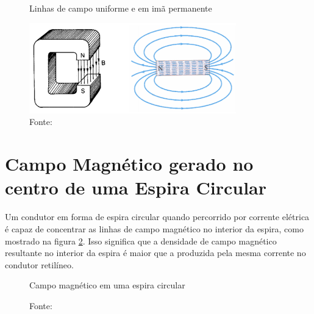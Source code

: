 \begin{figure}[H]
    \centering
     \caption{Linhas de campo uniforme e em imã permanente}
     \includegraphics[width=0.8\textwidth]{./img/mussoi10.png}
     \caption*{Fonte: \cite{mussoi2}}
     \label{fig:muss2}
\end{figure}


\section{Campo Magnético gerado no centro de uma Espira Circular}
Um condutor em forma de espira circular quando percorrido por corrente elétrica é capaz de
concentrar as linhas de campo magnético no interior da espira, como mostrado na figura \ref{fig:campoc}. Isso significa que
a densidade de campo magnético resultante no interior da espira é maior que a produzida pela mesma
corrente no condutor retilíneo. \cite{mussoi1} 

\begin{figure}[H]
    \centering
     \caption{Campo magnético em uma espira circular}
     \label{fig:campoc}
     \caption*{Fonte: \cite{mussoi1}}
\end{figure}

